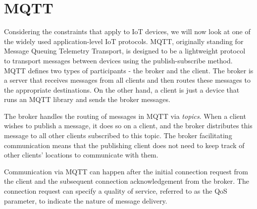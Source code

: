 \section{MQTT}

Considering the constraints that apply to IoT devices, we will now look at one of the widely used application-level IoT protocols.
MQTT, originally standing for Message Queuing Telemetry Transport, is designed to be a lightweight protocol to transport messages between devices using the publish-subscribe method.
MQTT defines two types of participants - the broker and the client.
The broker is a server that receives messages from all clients and then routes these messages to the appropriate destinations.
On the other hand, a client is just a device that runs an MQTT library and sends the broker messages.

The broker handles the routing of messages in MQTT via \textit{topics}.
When a client wishes to publish a message, it does so on a client, and the broker distributes this message to all other clients subscribed to this topic.
The broker facilitating communication means that the publishing client does not need to keep track of other clients' locations to communicate with them.

Communication via MQTT can happen after the initial connection request from the client and the subsequent connection acknowledgement from the broker.
The connection request can specify a quality of service, referred to as the QoS parameter, to indicate the nature of message delivery.

